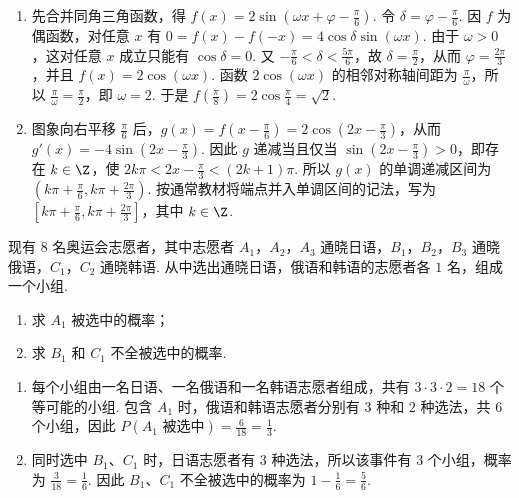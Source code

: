 \begin{solution}
\begin{enumerate}
\item 先合并同角三角函数，得 \(f(x)=2\sin\left(\omega x+\varphi-\frac{\pi}{6}\right)\). 令 \(\delta=\varphi-\frac\pi6\). 因 \(f\) 为偶函数，对任意 \(x\) 有 \(0=f(x)-f(-x)=4\cos\delta\sin(\omega x)\). 由于 \(\omega>0\)，这对任意 \(x\) 成立只能有 \(\cos\delta=0\). 又 \(-\frac\pi6<\delta<\frac{5\pi}6\)，故 \(\delta=\frac\pi2\)，从而 \(\varphi=\frac{2\pi}3\)，并且 \(f(x)=2\cos(\omega x)\). 函数 \(2\cos(\omega x)\) 的相邻对称轴间距为 \(\frac\pi\omega\)，所以 \(\frac\pi\omega=\frac\pi2\)，即 \(\omega=2\). 于是 \(f\left(\frac\pi8\right)=2\cos\frac\pi4=\sqrt2\).

\item 图象向右平移 \(\frac\pi6\) 后，\(g(x)=f\left(x-\frac\pi6\right)=2\cos\left(2x-\frac\pi3\right)\)，从而 \(g'(x)=-4\sin\left(2x-\frac\pi3\right)\). 因此 \(g\) 递减当且仅当 \(\sin\left(2x-\frac\pi3\right)>0\)，即存在 \(k\in\Z\)，使 \(2k\pi<2x-\frac\pi3<(2k+1)\pi\). 所以 \(g(x)\) 的单调递减区间为 \(\left(k\pi+\frac\pi6,k\pi+\frac{2\pi}3\right)\). 按通常教材将端点并入单调区间的记法，写为 \(\left[k\pi+\frac\pi6,k\pi+\frac{2\pi}3\right]\)，其中 \(k\in\Z\).
\end{enumerate}
\end{solution}

\begin{problem}
现有 \(8\) 名奥运会志愿者，其中志愿者 \(A_{1}\)，\(A_{2}\)，\(A_{3}\) 通晓日语，\(B_{1}\)，\(B_{2}\)，\(B_{3}\) 通晓俄语，\(C_{1}\)，\(C_{2}\) 通晓韩语. 从中选出通晓日语，俄语和韩语的志愿者各 \(1\) 名，组成一个小组.
\begin{enumerate}
\item 求 \(A_{1}\) 被选中的概率；
\item 求 \(B_{1}\) 和 \(C_{1}\) 不全被选中的概率.
\end{enumerate}
\end{problem}

\begin{solution}
\begin{enumerate}
\item 每个小组由一名日语、一名俄语和一名韩语志愿者组成，共有 \(3\cdot3\cdot2=18\) 个等可能的小组. 包含 \(A_1\) 时，俄语和韩语志愿者分别有 \(3\) 种和 \(2\) 种选法，共 \(6\) 个小组，因此 \(P(A_1\text{ 被选中})=\frac6{18}=\frac13\).

\item 同时选中 \(B_1\)、\(C_1\) 时，日语志愿者有 \(3\) 种选法，所以该事件有 \(3\) 个小组，概率为 \(\frac3{18}=\frac16\). 因此 \(B_1\)、\(C_1\) 不全被选中的概率为
\(1-\frac16=\frac56\).
\end{enumerate}
\end{solution}

